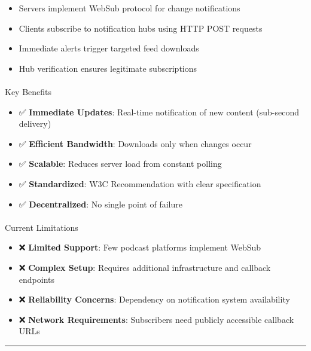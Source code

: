 \documentclass[
  letterpaper,
  DIV=11,
  numbers=noendperiod]{scrartcl}
\makeatletter
\let\oldparagraph\paragraph
\renewcommand{\paragraph}{
    \@ifstar
      \xxxParagraphStar
      \xxxParagraphNoStar
  }
\newcommand{\xxxParagraphStar}[1]{\oldparagraph*{#1}\mbox{}}
\newcommand{\xxxParagraphNoStar}[1]{\oldparagraph{#1}\mbox{}}
\providecommand{\tightlist}{%
  \setlength{\itemsep}{0pt}\setlength{\parskip}{0pt}}\usepackage{longtable,booktabs,array}
\makeatother
\begin{document}
\begin{itemize}
\tightlist
\item
  Servers implement WebSub protocol for change notifications
\item
  Clients subscribe to notification hubs using HTTP POST requests
\item
  Immediate alerts trigger targeted feed downloads
\item
  Hub verification ensures legitimate subscriptions
\end{itemize}

\paragraph{Key Benefits}\label{key-benefits}

\begin{itemize}
\tightlist
\item
  ✅ \textbf{Immediate Updates}: Real-time notification of new content
  (sub-second delivery)
\item
  ✅ \textbf{Efficient Bandwidth}: Downloads only when changes occur
\item
  ✅ \textbf{Scalable}: Reduces server load from constant polling
\item
  ✅ \textbf{Standardized}: W3C Recommendation with clear specification
\item
  ✅ \textbf{Decentralized}: No single point of failure
\end{itemize}

\paragraph{Current Limitations}\label{current-limitations}

\begin{itemize}
\tightlist
\item
  ❌ \textbf{Limited Support}: Few podcast platforms implement WebSub
\item
  ❌ \textbf{Complex Setup}: Requires additional infrastructure and
  callback endpoints
\item
  ❌ \textbf{Reliability Concerns}: Dependency on notification system
  availability
\item
  ❌ \textbf{Network Requirements}: Subscribers need publicly accessible
  callback URLs
\end{itemize}

\begin{center}\rule{0.5\linewidth}{0.5pt}\end{center}
\end{document}
